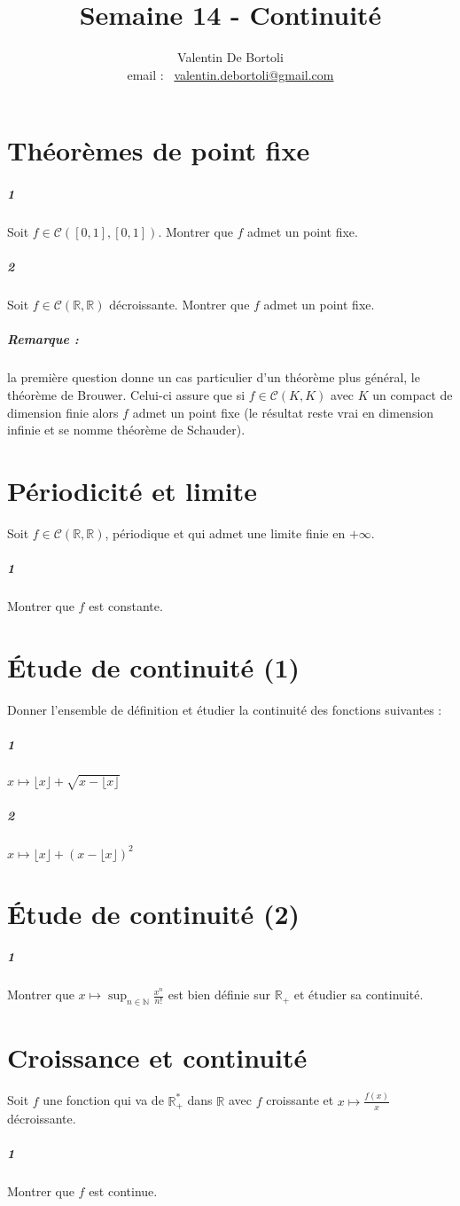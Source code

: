 \documentclass[10pt,a4paper]{article}
\title{Semaine 14 - Continuité}
\author{Valentin De Bortoli \\ email : \ \href{mailto:valentin.debortoli@gmail.com}{valentin.debortoli@gmail.com}}
\date{}
\begin{document}
\maketitle

\section{Théorèmes de point fixe}
\subparagraph{1} Soit $f \in \mathcal{C}([0,1],[0,1])$. Montrer que $f$ admet un point fixe.
\subparagraph{2} Soit $f \in \mathcal{C}(\mathbb{R},\mathbb{R})$ décroissante. Montrer que $f$ admet un point fixe.
\subparagraph{Remarque :} la première question donne un cas particulier d'un théorème plus général, le théorème de Brouwer. Celui-ci assure que si $f \in \mathcal{C}(K,K)$ avec $K$ un compact de dimension finie alors $f$ admet un point fixe (le résultat reste vrai en dimension infinie et se nomme théorème de Schauder).

\section{Périodicité et limite}
Soit $f \in \mathcal{C}(\mathbb{R},\mathbb{R})$, périodique et qui admet une limite finie en $+\infty$. 
\subparagraph{1} Montrer que $f$ est constante.

\section{Étude de continuité (1)}
Donner l'ensemble de définition et étudier la continuité des fonctions suivantes :
\subparagraph{1} $x \mapsto \lfloor x \rfloor + \sqrt{x- \lfloor x \rfloor}$
\subparagraph{2} $x \mapsto \lfloor x \rfloor + (x- \lfloor x \rfloor)^2$

\section{Étude de continuité (2)}
\subparagraph{1} Montrer que $x \mapsto \sup_{n \in \mathbb{N}} \frac{x^n}{n !}$ est bien définie sur $\mathbb{R}_+$ et étudier sa continuité.

\section{Croissance et continuité}
Soit $f$ une fonction qui va de $\mathbb{R}_+^*$ dans $\mathbb{R}$ avec $f$ croissante et $x \mapsto \frac{f(x)}{x}$ décroissante.
\subparagraph{1}Montrer que $f$ est continue.
\end{document}
